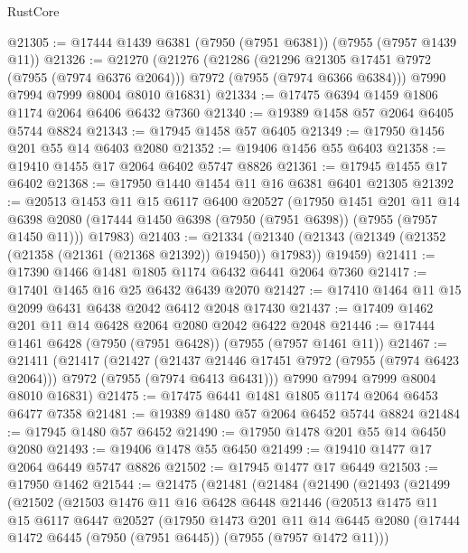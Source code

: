 \begin{lexlean}{RustCore}
\begin{coremodule}
@21305 := @17444 @1439 @6381 (@7950 (@7951 @6381)) (@7955 (@7957 @1439 @11))
@21326 := @21270
    (@21276
      (@21286
        (@21296 @21305 @17451 @7972 (@7955 (@7974 @6376 @2064)))
        @7972
        (@7955 (@7974 @6366 @6384)))
      @7990
      @7994
      @7999
      @8004
      @8010
      @16831)
@21334 := @17475 @6394 @1459 @1806 @1174 @2064 @6406 @6432 @7360
@21340 := @19389 @1458 @57 @2064 @6405 @5744 @8824
@21343 := @17945 @1458 @57 @6405
@21349 := @17950 @1456 @201 @55 @14 @6403 @2080
@21352 := @19406 @1456 @55 @6403
@21358 := @19410 @1455 @17 @2064 @6402 @5747 @8826
@21361 := @17945 @1455 @17 @6402
@21368 := @17950 @1440 @1454 @11 @16 @6381 @6401 @21305
@21392 := @20513
    @1453
    @11
    @15
    @6117
    @6400
    @20527
    (@17950
      @1451
      @201
      @11
      @14
      @6398
      @2080
      (@17444 @1450 @6398 (@7950 (@7951 @6398)) (@7955 (@7957 @1450 @11)))
      @17983)
@21403 := @21334
    (@21340 (@21343 (@21349 (@21352 (@21358 (@21361 (@21368 @21392)) @19450)) @17983)) @19459)
@21411 := @17390 @1466 @1481 @1805 @1174 @6432 @6441 @2064 @7360
@21417 := @17401 @1465 @16 @25 @6432 @6439 @2070
@21427 := @17410 @1464 @11 @15 @2099 @6431 @6438 @2042 @6412 @2048 @17430
@21437 := @17409 @1462 @201 @11 @14 @6428 @2064 @2080 @2042 @6422 @2048
@21446 := @17444 @1461 @6428 (@7950 (@7951 @6428)) (@7955 (@7957 @1461 @11))
@21467 := @21411
    (@21417
      (@21427
        (@21437 @21446 @17451 @7972 (@7955 (@7974 @6423 @2064)))
        @7972
        (@7955 (@7974 @6413 @6431)))
      @7990
      @7994
      @7999
      @8004
      @8010
      @16831)
@21475 := @17475 @6441 @1481 @1805 @1174 @2064 @6453 @6477 @7358
@21481 := @19389 @1480 @57 @2064 @6452 @5744 @8824
@21484 := @17945 @1480 @57 @6452
@21490 := @17950 @1478 @201 @55 @14 @6450 @2080
@21493 := @19406 @1478 @55 @6450
@21499 := @19410 @1477 @17 @2064 @6449 @5747 @8826
@21502 := @17945 @1477 @17 @6449
@21503 := @17950 @1462
@21544 := @21475
    (@21481
      (@21484
        (@21490
          (@21493
            (@21499
              (@21502
                (@21503
                  @1476
                  @11
                  @16
                  @6428
                  @6448
                  @21446
                  (@20513
                    @1475
                    @11
                    @15
                    @6117
                    @6447
                    @20527
                    (@17950
                      @1473
                      @201
                      @11
                      @14
                      @6445
                      @2080
                      (@17444 @1472 @6445 (@7950 (@7951 @6445)) (@7955 (@7957 @1472 @11)))

\end{coremodule}
\end{lexlean}
